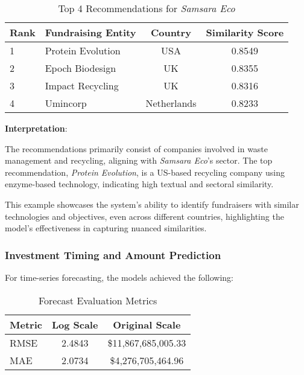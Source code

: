\documentclass[sigconf]{acmart}
\begin{document}
\begin{table}[htpb]
    \centering
    \caption{Top 4 Recommendations for \textit{Samsara Eco}}
    \label{tab:recommendations_example}
    \begin{tabular}{llcc}
        \toprule
        \textbf{Rank} & \textbf{Fundraising Entity} & \textbf{Country} & \textbf{Similarity Score} \\
        \midrule
        1 & Protein Evolution & USA & 0.8549 \\
        2 & Epoch Biodesign & UK & 0.8355 \\
        3 & Impact Recycling & UK & 0.8316 \\
        4 & Umincorp & Netherlands & 0.8233 \\
        \bottomrule
    \end{tabular}
\end{table}

\textbf{Interpretation}:

The recommendations primarily consist of companies involved in waste management and recycling, aligning with \textit{Samsara Eco}'s sector. The top recommendation, \textit{Protein Evolution}, is a US-based recycling company using enzyme-based technology, indicating high textual and sectoral similarity.

This example showcases the system's ability to identify fundraisers with similar technologies and objectives, even across different countries, highlighting the model's effectiveness in capturing nuanced similarities.

\subsubsection{Investment Timing and Amount Prediction}

For time-series forecasting, the models achieved the following:

\begin{table}[htpb]
    \centering
    \caption{Forecast Evaluation Metrics}
    \label{tab:forecast_metrics}
    \begin{tabular}{lcc}
        \toprule
        Metric & Log Scale & Original Scale \\
        \midrule
        RMSE & 2.4843 & \$11,867,685,005.33 \\
        MAE & 2.0734 & \$4,276,705,464.96 \\
        \bottomrule
    \end{tabular}
\end{table}
\end{document}
